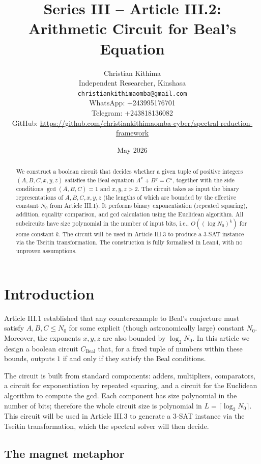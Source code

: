 \documentclass[11pt,a4paper]{article}
\title{Series III – Article III.2: Arithmetic Circuit for Beal's Equation}
\author{Christian Kithima \\
Independent Researcher, Kinshasa \\
\texttt{christiankithimaomba@gmail.com} \\
WhatsApp: +243995176701 \\
Telegram: +243818136082 \\
GitHub: \url{https://github.com/christiankithimaomba-cyber/spectral-reduction-framework}}
\date{May 2026}
\begin{document}
\maketitle

\begin{abstract}
We construct a boolean circuit that decides whether a given tuple of positive integers \((A,B,C,x,y,z)\) satisfies the Beal equation \(A^x + B^y = C^z\), together with the side conditions \(\gcd(A,B,C)=1\) and \(x,y,z > 2\). The circuit takes as input the binary representations of \(A,B,C,x,y,z\) (the lengths of which are bounded by the effective constant \(N_0\) from Article III.1). It performs binary exponentiation (repeated squaring), addition, equality comparison, and gcd calculation using the Euclidean algorithm. All subcircuits have size polynomial in the number of input bits, i.e., \(O((\log N_0)^k)\) for some constant \(k\). The circuit will be used in Article III.3 to produce a 3‑SAT instance via the Tseitin transformation. The construction is fully formalised in Lean4, with no unproven assumptions.
\end{abstract}

\tableofcontents

\section{Introduction}

Article III.1 established that any counterexample to Beal's conjecture must satisfy \(A,B,C \le N_0\) for some explicit (though astronomically large) constant \(N_0\). Moreover, the exponents \(x,y,z\) are also bounded by \(\log_2 N_0\). In this article we design a boolean circuit \(C_{\text{Beal}}\) that, for a fixed tuple of numbers within these bounds, outputs \(1\) if and only if they satisfy the Beal conditions.

The circuit is built from standard components: adders, multipliers, comparators, a circuit for exponentiation by repeated squaring, and a circuit for the Euclidean algorithm to compute the gcd. Each component has size polynomial in the number of bits; therefore the whole circuit size is polynomial in \(L = \lceil \log_2 N_0\rceil\). This circuit will be used in Article III.3 to generate a 3‑SAT instance via the Tseitin transformation, which the spectral solver will then decide.

\subsection{The magnet metaphor}
\end{document}
